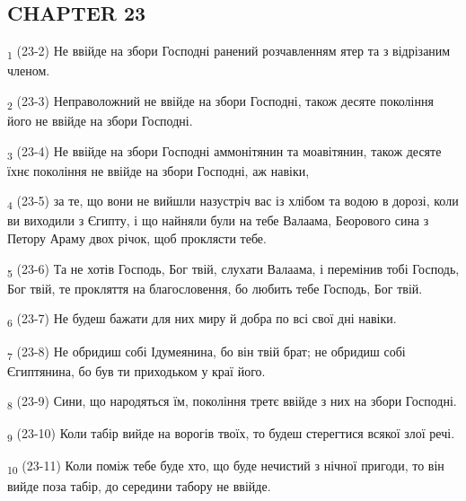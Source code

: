 \subsection{CHAPTER 23}
\begin{tcolorbox}
\textsubscript{1} (23-2) Не ввійде на збори Господні ранений розчавленням ятер та з відрізаним членом.
\end{tcolorbox}
\begin{tcolorbox}
\textsubscript{2} (23-3) Неправоложний не ввійде на збори Господні, також десяте покоління його не ввійде на збори Господні.
\end{tcolorbox}
\begin{tcolorbox}
\textsubscript{3} (23-4) Не ввійде на збори Господні аммонітянин та моавітянин, також десяте їхнє покоління не ввійде на збори Господні, аж навіки,
\end{tcolorbox}
\begin{tcolorbox}
\textsubscript{4} (23-5) за те, що вони не вийшли назустріч вас із хлібом та водою в дорозі, коли ви виходили з Єгипту, і що найняли були на тебе Валаама, Беорового сина з Петору Араму двох річок, щоб проклясти тебе.
\end{tcolorbox}
\begin{tcolorbox}
\textsubscript{5} (23-6) Та не хотів Господь, Бог твій, слухати Валаама, і перемінив тобі Господь, Бог твій, те прокляття на благословення, бо любить тебе Господь, Бог твій.
\end{tcolorbox}
\begin{tcolorbox}
\textsubscript{6} (23-7) Не будеш бажати для них миру й добра по всі свої дні навіки.
\end{tcolorbox}
\begin{tcolorbox}
\textsubscript{7} (23-8) Не обридиш собі Ідумеянина, бо він твій брат; не обридиш собі Єгиптянина, бо був ти приходьком у краї його.
\end{tcolorbox}
\begin{tcolorbox}
\textsubscript{8} (23-9) Сини, що народяться їм, покоління третє ввійде з них на збори Господні.
\end{tcolorbox}
\begin{tcolorbox}
\textsubscript{9} (23-10) Коли табір вийде на ворогів твоїх, то будеш стерегтися всякої злої речі.
\end{tcolorbox}
\begin{tcolorbox}
\textsubscript{10} (23-11) Коли поміж тебе буде хто, що буде нечистий з нічної пригоди, то він вийде поза табір, до середини табору не ввійде.
\end{tcolorbox}
